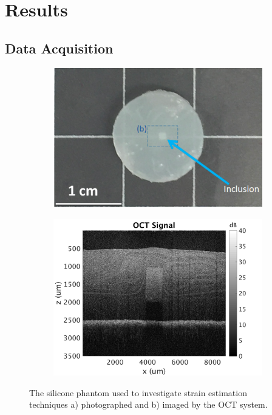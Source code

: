 \chapter{Results}\label{results}


\section{Data Acquisition}\label{data}

\begin{figure}
	\centering
	\begin{subfigure}{0.47\textwidth}
		\centering
		\includegraphics[width=\textwidth]{figures/phantom.png}
	\end{subfigure}
	\quad
	\begin{subfigure}{0.49\textwidth}
		\centering
		\includegraphics[width=\textwidth]{figures/oct.png}
	\end{subfigure}	
	\caption{The silicone phantom used to investigate strain estimation techniques a) photographed and b) imaged by the OCT system.}
	\label{oct_image}	
\end{figure}

